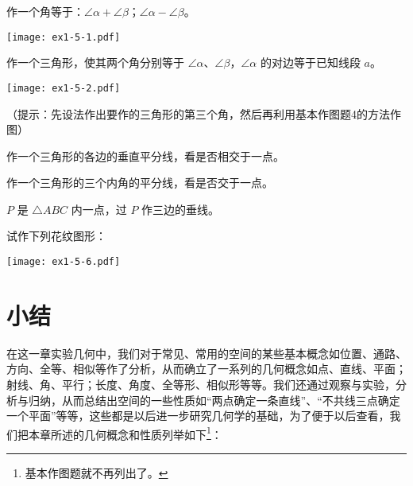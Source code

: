 \begin{Exercise}
\begin{question}
	\item\label{exec:1-5-1} 作一个角等于：$\angle\alpha+\angle \beta$；$\angle\alpha-\angle \beta$。
	\begin{figurehere}
		\begin{minipage}{\linewidth}\centering
			\texttt{[image: ex1-5-1.pdf]}
			\caption*{第 \ref{exec:1-5-1} 题}
		\end{minipage}
	\end{figurehere}
	\item\label{exec:1-5-2} 作一个三角形，使其两个角分别等于 $\angle\alpha$、$\angle \beta$，$\angle \alpha$ 的对边等于已知线段 $a$。
	\begin{figurehere}
		\begin{minipage}{\linewidth}\centering
			\texttt{[image: ex1-5-2.pdf]}
			\caption*{第 \ref{exec:1-5-2} 题}
		\end{minipage}
	\end{figurehere}
	（提示：先设法作出要作的三角形的第三个角，然后再利用基本作图题4的方法作图）
	\item 作一个三角形的各边的垂直平分线，看是否相交于一点。
	\item 作一个三角形的三个内角的平分线，看是否交于一点。
	\item $P$ 是 $\triangle ABC$ 内一点，过 $P$ 作三边的垂线。
	\item\label{exec:1-5-6} 试作下列花纹图形：
\begin{figurehere}
	\begin{minipage}{\linewidth}\centering
		\texttt{[image: ex1-5-6.pdf]}
		\caption*{第 \ref{exec:1-5-6} 题}
	\end{minipage}
\end{figurehere}
\end{question}
\end{Exercise}

\section*{小结}

在这一章实验几何中，我们对于常见、常用的空间的某些基本概念如位置、通路、方向、全等、相似等作了分析，从而确立了一系列的几何概念如点、直线、平面；射线、角、平行；长度、角度、全等形、相似形等等。我们还通过观察与实验，分析与归纳，从而总结出空间的一些性质如“两点确定一条直线”、“不共线三点确定一个平面”等等，这些都是以后进一步研究几何学的基础，为了便于以后查看，我们把本章所述的几何概念和性质列举如下\footnote{基本作图题就不再列出了。}：

